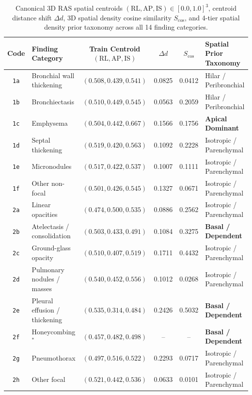 \documentclass[11pt,a4paper]{article}
\begin{document}
\begin{table}[htbp]
\centering
\caption{Canonical 3D RAS spatial centroids $(\text{RL}, \text{AP}, \text{IS}) \in [0.0, 1.0]^3$, centroid distance shift $\Delta d$, 3D spatial density cosine similarity $S_{\text{cos}}$, and 4-tier spatial density prior taxonomy across all 14 finding categories.}
\label{tab:spatial_centroids}
\scriptsize
\setlength{\tabcolsep}{4.5pt}
\begin{tabularx}{\linewidth}{c >{\hsize=1.15\hsize\raggedright\arraybackslash}X c c c >{\hsize=0.85\hsize\centering\arraybackslash}X}
\toprule
\textbf{Code} & \textbf{Finding Category} & \makecell{\textbf{Train Centroid}\\\textbf{$(\text{RL}, \text{AP}, \text{IS})$}} & $\Delta d$ & $S_{\text{cos}}$ & \makecell{\textbf{Spatial Prior}\\\textbf{Taxonomy}} \\
\midrule
\texttt{1a} & Bronchial wall thickening & $(0.508, 0.439, 0.541)$ & 0.0825 & 0.0412 & Hilar / Peribronchial \\
\texttt{1b} & Bronchiectasis & $(0.510, 0.449, 0.545)$ & 0.0563 & 0.2059 & Hilar / Peribronchial \\
\texttt{1c} & Emphysema & $(0.504, 0.442, 0.667)$ & 0.1566 & 0.1756 & \textbf{Apical Dominant} \\
\texttt{1d} & Septal thickening & $(0.519, 0.420, 0.563)$ & 0.1092 & 0.2228 & Isotropic / Parenchymal \\
\texttt{1e} & Micronodules & $(0.517, 0.422, 0.537)$ & 0.1007 & 0.1111 & Isotropic / Parenchymal \\
\texttt{1f} & Other non-focal & $(0.501, 0.426, 0.545)$ & 0.1327 & 0.0671 & Isotropic / Parenchymal \\
\texttt{2a} & Linear opacities & $(0.474, 0.500, 0.535)$ & 0.0886 & 0.2562 & Isotropic / Parenchymal \\
\texttt{2b} & Atelectasis / consolidation & $(0.503, 0.433, 0.491)$ & 0.1084 & 0.3275 & \textbf{Basal / Dependent} \\
\texttt{2c} & Ground-glass opacity & $(0.510, 0.407, 0.519)$ & 0.1711 & 0.4432 & Isotropic / Parenchymal \\
\texttt{2d} & Pulmonary nodules / masses & $(0.540, 0.452, 0.556)$ & 0.1012 & 0.0268 & Isotropic / Parenchymal \\
\texttt{2e} & Pleural effusion / thickening & $(0.535, 0.314, 0.484)$ & 0.2426 & 0.5032 & \textbf{Basal / Dependent} \\
\texttt{2f} & Honeycombing$^*$ & $(0.457, 0.482, 0.498)$ & -- & -- & \textbf{Basal / Dependent} \\
\texttt{2g} & Pneumothorax & $(0.497, 0.516, 0.522)$ & 0.2293 & 0.0717 & Isotropic / Parenchymal \\
\texttt{2h} & Other focal & $(0.521, 0.442, 0.536)$ & 0.0633 & 0.0101 & Isotropic / Parenchymal \\
\bottomrule
\end{tabularx}


\end{table}
\end{document}
